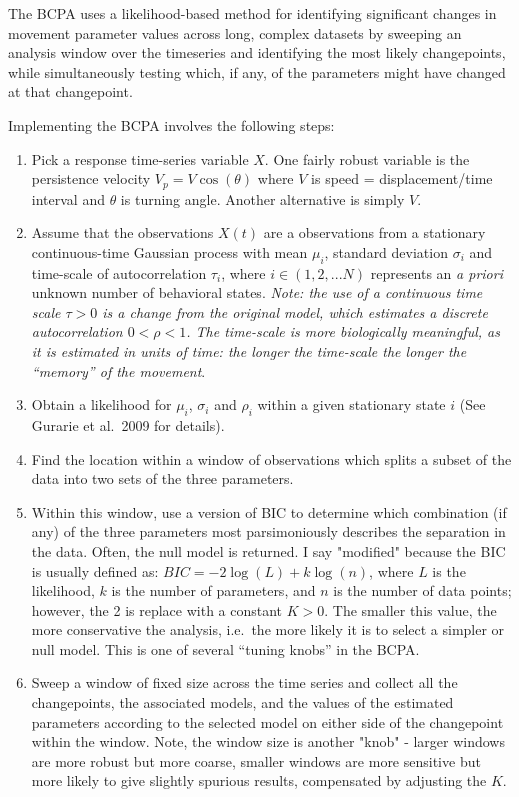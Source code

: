 \documentclass[10pt]{article}\usepackage[]{graphicx}\usepackage[]{color}
\newcommand{\ben}{\begin{enumerate}}
\newcommand{\een}{\end{enumerate}}
\newcommand{\I}{\item}
\begin{document}
The BCPA uses a likelihood-based method for identifying significant changes in movement parameter values across long, complex datasets by sweeping an analysis window over the timeseries and identifying the most likely changepoints, while simultaneously testing which, if any, of the parameters might have changed at that changepoint.  

Implementing the BCPA involves the following steps:

\ben
\I Pick a response time-series variable $X$.  One fairly robust variable is the persistence velocity $V_p = V \cos(\theta)$ where $V$ is speed = displacement/time interval and $\theta$ is turning angle.  Another alternative is simply $V$. 

\I Assume that the observations $X(t)$ are a observations from a stationary continuous-time Gaussian process with mean $\mu_i$, standard deviation $\sigma_i$ and time-scale of autocorrelation $\tau_i$, where $i \in (1,2,...N)$ represents an \emph{a priori} unknown number of behavioral states. \emph{Note: the use of a continuous time scale $\tau >0$ is a change from the original model, which estimates a discrete autocorrelation $0 < \rho < 1$.  The time-scale is more biologically meaningful, as it is estimated in units of time: the longer the time-scale the longer the ``memory'' of the movement}.

\I Obtain a likelihood for $\mu_i$, $\sigma_i$ and $\rho_i$ within a given stationary state $i$ (See Gurarie et al.~2009 for details).

\I Find the location within a window of observations which splits a subset of the data into two sets of the three parameters. 

\I Within this window, use a version of BIC to determine which combination (if any) of the three parameters most parsimoniously describes the separation in the data.  Often, the null model is returned.  I say "modified" because the BIC is usually defined as: $BIC = - 2 \log(L) + k \log(n)$, where $L$ is the likelihood, $k$ is the number of parameters, and $n$ is the number of data points; however, the 2 is replace with a constant $K > 0$.  The smaller this value, the more conservative the analysis, i.e.~the more likely it is to select a simpler or null model.  This is one of several ``tuning knobs'' in the BCPA. 

\I Sweep a window of fixed size across the time series and collect all the changepoints, the  associated models, and the values of the estimated parameters according to the selected model on either side of the changepoint within the window.   Note, the window size is another "knob" - larger windows are more robust but more coarse, smaller windows are more sensitive but more likely to give slightly spurious results, compensated by adjusting the $K$.
\een
\end{document}
